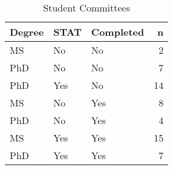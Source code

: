 \begin{table}[h]
\centering
\caption{Student Committees} 
\label{tab:committees}
\begin{tabular}{lllr}
  \hline
Degree & STAT & Completed & n \\ 
  \hline
MS & No & No &   2 \\ 
  PhD & No & No &   7 \\ 
  PhD & Yes & No &  14 \\ 
  MS & No & Yes &   8 \\ 
  PhD & No & Yes &   4 \\ 
  MS & Yes & Yes &  15 \\ 
  PhD & Yes & Yes &   7 \\ 
   \hline
\end{tabular}
\end{table}
